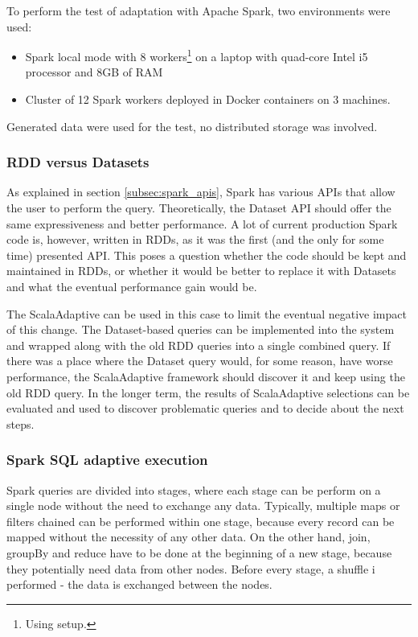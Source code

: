 To perform the test of adaptation with Apache Spark, two environments were used:

\begin{itemize}
	\item Spark local mode with 8 workers\footnote{Using  setup.} on a laptop with quad-core Intel i5 processor and 8GB of RAM
	\item Cluster of 12 Spark workers deployed in Docker containers on 3 machines. 	%
\end{itemize}

Generated data were used for the test, no distributed storage was involved.

\subsubsection{RDD versus Datasets}

As explained in section \ref{subsec:spark_apis}, Spark has various APIs that allow the user to perform the query. Theoretically, the Dataset API should offer the same expressiveness and better performance. A lot of current production Spark code is, however, written in RDDs, as it was the first (and the only for some time) presented API. This poses a question whether the code should be kept and maintained in RDDs, or whether it would be better to replace it with Datasets and what the eventual performance gain would be.

The ScalaAdaptive can be used in this case to limit the eventual negative impact of this change. The Dataset-based queries can be implemented into the system and wrapped along with the old RDD queries into a single combined query. If there was a place where the Dataset query would, for some reason, have worse performance, the ScalaAdaptive framework should discover it and keep using the old RDD query. In the longer term, the results of ScalaAdaptive selections can be evaluated and used to discover problematic queries and to decide about the next steps.



\subsubsection{Spark SQL adaptive execution}

Spark queries are divided into stages, where each stage can be perform on a single node without the need to exchange any data. Typically, multiple maps or filters chained can be performed within one stage, because every record can be mapped without the necessity of any other data. On the other hand, join, groupBy and reduce have to be done at the beginning of a new stage, because they potentially need data from other nodes. Before every stage, a shuffle i performed - the data is exchanged between the nodes. 

